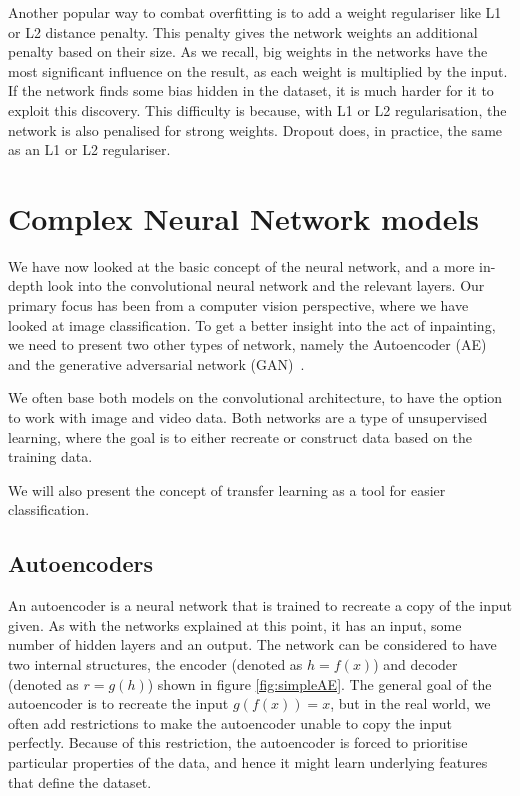 Another popular way to combat overfitting is to add a weight regulariser like L1 or L2 distance penalty. This penalty gives the network weights an additional penalty based on their size.
As we recall, big weights in the networks have the most significant influence on the result, as each weight is multiplied by the input. If the network finds some bias hidden in the dataset, it is much harder for it to exploit this discovery.
This difficulty is because, with L1 or L2 regularisation, the network is also penalised for strong weights.
Dropout does, in practice, the same as an L1 or L2 regulariser. 


\section{Complex Neural Network models}
We have now looked at the basic concept of the neural network, and a more in-depth look into the convolutional neural network and the relevant layers.
Our primary focus has been from a computer vision perspective, where we have looked at image classification. 
To get a better insight into the act of inpainting, we need to present two other types of network, namely the Autoencoder (AE)~\cite{Rumelhart:1986:LIR:104279.104293} and the generative adversarial network (GAN)~\cite{Goodfellow:2014:GAN:2969033.2969125}.

We often base both models on the convolutional architecture, to have the option to work with image and video data. 
Both networks are a type of unsupervised learning, where the goal is to either recreate or construct data based on the training data.

We will also present the concept of transfer learning as a tool for easier classification.


\subsection{Autoencoders}
\label{cha:Explaining_autoencoders}
An autoencoder is a neural network that is trained to recreate a copy of the input given. 
As with the networks explained at this point, it has an input, some number of hidden layers and an output. The network can be considered to have two internal structures, the encoder (denoted as $h=f(x)$) and decoder (denoted as $r=g(h)$) shown in figure \ref{fig:simpleAE}.
The general goal of the autoencoder is to recreate the input $g(f(x)) = x$, but in the real world, we often add restrictions to make the autoencoder unable to copy the input perfectly. Because of this restriction, the autoencoder is forced to prioritise particular properties of the data, and hence it might learn underlying features that define the dataset.

